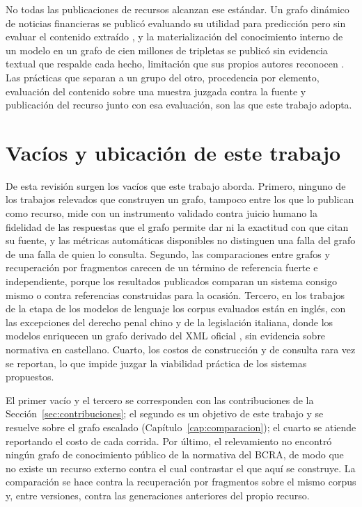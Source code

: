 \documentclass[12pt,a4paper]{report}
\begin{document}
No todas las publicaciones de recursos alcanzan ese estándar. Un grafo dinámico de noticias financieras se publicó evaluando su utilidad para predicción pero sin evaluar el contenido extraído \cite{li2024findkg}, y la materialización del conocimiento interno de un modelo en un grafo de cien millones de tripletas se publicó sin evidencia textual que respalde cada hecho, limitación que sus propios autores reconocen \cite{hu2025gptkb}. Las prácticas que separan a un grupo del otro, procedencia por elemento, evaluación del contenido sobre una muestra juzgada contra la fuente y publicación del recurso junto con esa evaluación, son las que este trabajo adopta.

\section{Vacíos y ubicación de este trabajo}
\label{sec:vacios}

De esta revisión surgen los vacíos que este trabajo aborda. Primero, ninguno de los trabajos relevados que construyen un grafo, tampoco entre los que lo publican como recurso, mide con un instrumento validado contra juicio humano la fidelidad de las respuestas que el grafo permite dar ni la exactitud con que citan su fuente, y las métricas automáticas disponibles \cite{es2024ragas,min2023factscore} no distinguen una falla del grafo de una falla de quien lo consulta. Segundo, las comparaciones entre grafos y recuperación por fragmentos carecen de un término de referencia fuerte e independiente, porque los resultados publicados comparan un sistema consigo mismo o contra referencias construidas para la ocasión. Tercero, en los trabajos de la etapa de los modelos de lenguaje los corpus evaluados están en inglés, con las excepciones del derecho penal chino \cite{li2024jkem} y de la legislación italiana, donde los modelos enriquecen un grafo derivado del XML oficial \cite{colombo2025italian}, sin evidencia sobre normativa en castellano. Cuarto, los costos de construcción y de consulta rara vez se reportan, lo que impide juzgar la viabilidad práctica de los sistemas propuestos.

El primer vacío y el tercero se corresponden con las contribuciones de la Sección~\ref{sec:contribuciones}; el segundo es un objetivo de este trabajo y se resuelve sobre el grafo escalado (Capítulo~\ref{cap:comparacion}); el cuarto se atiende reportando el costo de cada corrida. Por último, el relevamiento no encontró ningún grafo de conocimiento público de la normativa del BCRA, de modo que no existe un recurso externo contra el cual contrastar el que aquí se construye. La comparación se hace contra la recuperación por fragmentos sobre el mismo corpus y, entre versiones, contra las generaciones anteriores del propio recurso.
\end{document}
